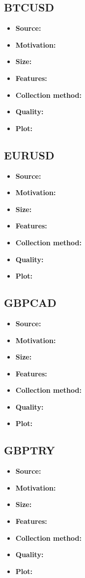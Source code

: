 \subsection{BTCUSD}
\begin{itemize}
	\item \textbf{Source:}
	\item \textbf{Motivation:}
	\item \textbf{Size:}
	\item \textbf{Features:}
	\item \textbf{Collection method:}
	\item \textbf{Quality:}
	\item \textbf{Plot:}
\end{itemize}
\subsection{EURUSD}
\begin{itemize}
	\item \textbf{Source:}
	\item \textbf{Motivation:}
	\item \textbf{Size:}
	\item \textbf{Features:}
	\item \textbf{Collection method:}
	\item \textbf{Quality:}
	\item \textbf{Plot:}
\end{itemize}
\subsection{GBPCAD}
\begin{itemize}
	\item \textbf{Source:}
	\item \textbf{Motivation:}
	\item \textbf{Size:}
	\item \textbf{Features:}
	\item \textbf{Collection method:}
	\item \textbf{Quality:}
	\item \textbf{Plot:}
\end{itemize}
\subsection{GBPTRY}
\begin{itemize}
	\item \textbf{Source:}
	\item \textbf{Motivation:}
	\item \textbf{Size:}
	\item \textbf{Features:}
	\item \textbf{Collection method:}
	\item \textbf{Quality:}
	\item \textbf{Plot:}
\end{itemize}

